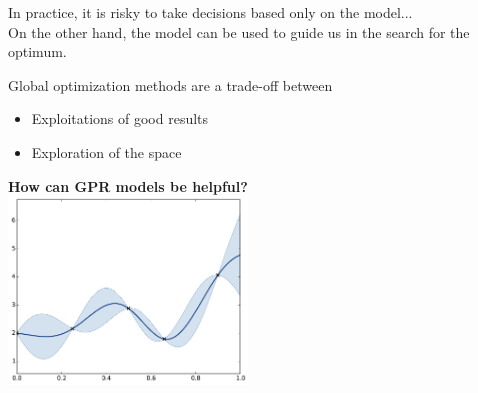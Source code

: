 \documentclass{beamer}
\begin{document}
\begin{frame}{}
\begin{figure}
    \end{figure}  
In practice, it is risky to take decisions based only on the model...\\
\vspace{3mm} 
On the other hand, the model can be used to guide us in the search for the optimum. 
\end{frame}

\begin{frame}{}
Global optimization methods are a trade-off between 
\begin{itemize}
	\item Exploitations of good results
	\item Exploration of the space
\end{itemize}
\vspace{3mm}
\begin{center}
\textbf{How can GPR models be helpful?}\\
\includegraphics[height=5cm]{figures/python/ego_0}
\end{center}
\end{frame}
\end{document}
